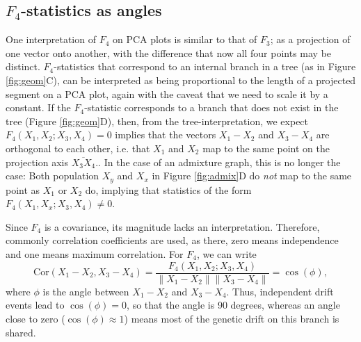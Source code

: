 \documentclass[12pt,fullpage, a4paper]{article}
\newcommand{\norm}[1]{\left\lVert#1\right\rVert}
\begin{document}
\subsection{$F_4$-statistics as angles}
One interpretation of $F_4$ on PCA plots is similar to that of $F_3$; as a projection of one vector onto another, with the difference that now all four points may be distinct. $F_4$-statistics that correspond to an internal branch in a tree (as in Figure \ref{fig:geom}C), can be interpreted as being proportional to the length of a projected segment on a PCA plot, again with the caveat that we need to scale it by a constant. If the $F_4$-statistic corresponds to a branch that does not exist in the tree (Figure \ref{fig:geom}D), then, from the tree-interpretation, we expect $F_4(X_1, X_2; X_3, X_4) = 0$ implies that the vectors $X_1 - X_2$ and $X_3 - X_4$ are orthogonal to each other, i.e. that $X_1$ and $X_2$  map to the same point on the projection axis $\overline{X_3X_4}$.. In the case of an admixture graph, this is no longer the case: Both population $X_y$ and $X_x$ in Figure \ref{fig:admix}D do \emph{not} map to the same point as $X_1$ or $X_2$ do, implying that statistics of the form $F_4(X_1, X_x; X_3, X_4) \neq 0$.


Since $F_4$ is a covariance, its magnitude lacks an interpretation. Therefore, commonly correlation coefficients are used, as there, zero means independence and one means maximum correlation. For $F_4$, we can write 
\begin{equation}
\text{Cor}(X_1 - X_2, X_3 - X_4) =  \frac{F_4( X_1, X_2; X_3, X_4) }{\norm{X_1-X_2}\norm{X_3-X_4}} = \cos(\phi),\label{eq:angle}
\end{equation}
where $\phi$ is the angle between $X_1 - X_2$ and $X_3 - X_4$. Thus, independent drift events lead to $\cos(\phi) = 0$, so that the angle is 90 degrees, whereas an angle close to zero ($\cos(\phi)\approx 1$) means most of the genetic drift on this branch is shared.
\end{document}
